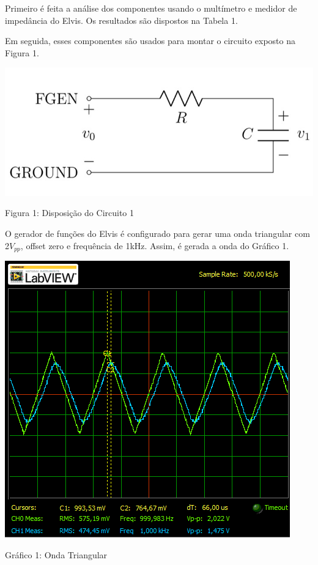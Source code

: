 \parag Primeiro é feita a análise dos componentes usando o multímetro e medidor de impedância do Elvis. Os resultados são dispostos na Tabela 1.



Em seguida, esses componentes são usados para montar o circuito exposto na Figura 1.

\begin{table}[h]
\centering
\includegraphics[scale=0.4]{figuras/figura1}
\end{table}
\begin{center}
Figura 1: Disposição do Circuito 1
\end{center}

O gerador de funções do Elvis é configurado para gerar uma onda triangular com 2$V_{pp}$, offset zero e frequência de 1kHz. Assim, é gerada a onda do Gráfico 1.

\begin{table}[h]
\centering
\includegraphics[scale=0.8]{graficos/rgadicoa1-triangulo}
\end{table}
\begin{center}
Gráfico 1: Onda Triangular
\end{center}



